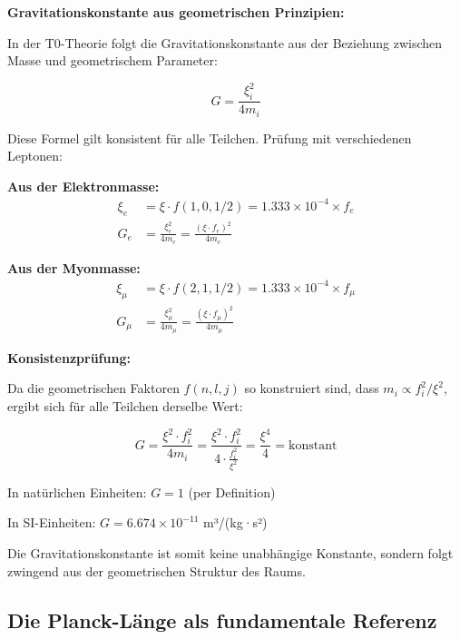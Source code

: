 \documentclass[12pt,a4paper]{article}
\begin{document}
	\begin{keyresult}
		\textbf{Gravitationskonstante aus geometrischen Prinzipien:}
		
		In der T0-Theorie folgt die Gravitationskonstante aus der Beziehung zwischen Masse und geometrischem Parameter:
		
		\begin{equation}
			G = \frac{\xi_i^2}{4m_i}
		\end{equation}
		
		Diese Formel gilt konsistent für alle Teilchen. Prüfung mit verschiedenen Leptonen:
		
		\textbf{Aus der Elektronmasse:}
		\begin{align}
			\xi_e &= \xi \cdot f(1,0,1/2) = 1.333 \times 10^{-4} \times f_e \\
			G_e &= \frac{\xi_e^2}{4m_e} = \frac{(\xi \cdot f_e)^2}{4m_e}
		\end{align}
		
		\textbf{Aus der Myonmasse:}
		\begin{align}
			\xi_\mu &= \xi \cdot f(2,1,1/2) = 1.333 \times 10^{-4} \times f_\mu \\
			G_\mu &= \frac{\xi_\mu^2}{4m_\mu} = \frac{(\xi \cdot f_\mu)^2}{4m_\mu}
		\end{align}
		
		\textbf{Konsistenzprüfung:}
		
		Da die geometrischen Faktoren $f(n,l,j)$ so konstruiert sind, dass $m_i \propto f_i^2/\xi^2$, ergibt sich für alle Teilchen derselbe Wert:
		
		\begin{equation}
			G = \frac{\xi^2 \cdot f_i^2}{4m_i} = \frac{\xi^2 \cdot f_i^2}{4 \cdot \frac{f_i^2}{\xi^2}} = \frac{\xi^4}{4} = \text{konstant}
		\end{equation}
		
		In natürlichen Einheiten: $G = 1$ (per Definition)
		
		In SI-Einheiten: $G = 6.674 \times 10^{-11}$ m³/(kg·s²)
		
		Die Gravitationskonstante ist somit keine unabhängige Konstante, sondern folgt zwingend aus der geometrischen Struktur des Raums.
	\end{keyresult}
	
	\subsection{Die Planck-Länge als fundamentale Referenz}
	
\end{document}
